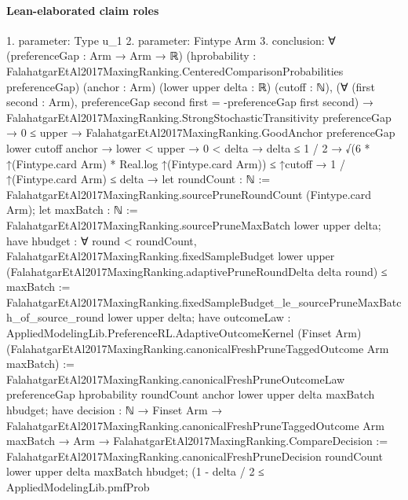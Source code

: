 \documentclass[10pt]{article}
\begin{document}
\paragraph{Lean-elaborated claim roles}\begin{ReviewVerbatim}
1. parameter: Type u_1
2. parameter: Fintype Arm
3. conclusion: ∀ (preferenceGap : Arm → Arm → ℝ)
  (hprobability : FalahatgarEtAl2017MaxingRanking.CenteredComparisonProbabilities preferenceGap) (anchor : Arm)
  (lower upper delta : ℝ) (cutoff : ℕ),
  (∀ (first second : Arm), preferenceGap second first = -preferenceGap first second) →
    FalahatgarEtAl2017MaxingRanking.StrongStochasticTransitivity preferenceGap →
      0 ≤ upper →
        FalahatgarEtAl2017MaxingRanking.GoodAnchor preferenceGap lower cutoff anchor →
          lower < upper →
            0 < delta →
              delta ≤ 1 / 2 →
                √(6 * ↑(Fintype.card Arm) * Real.log ↑(Fintype.card Arm)) ≤ ↑cutoff →
                  1 / ↑(Fintype.card Arm) ≤ delta →
                    let roundCount : ℕ := FalahatgarEtAl2017MaxingRanking.sourcePruneRoundCount (Fintype.card Arm);
                    let maxBatch : ℕ := FalahatgarEtAl2017MaxingRanking.sourcePruneMaxBatch lower upper delta;
                    have hbudget :
                      ∀ round < roundCount,
                        FalahatgarEtAl2017MaxingRanking.fixedSampleBudget lower upper
                            (FalahatgarEtAl2017MaxingRanking.adaptivePruneRoundDelta delta round) ≤
                          maxBatch :=
                      FalahatgarEtAl2017MaxingRanking.fixedSampleBudget_le_sourcePruneMaxBatch_of_source_round lower
                        upper delta;
                    have outcomeLaw :
                      AppliedModelingLib.PreferenceRL.AdaptiveOutcomeKernel (Finset Arm)
                        (FalahatgarEtAl2017MaxingRanking.canonicalFreshPruneTaggedOutcome Arm maxBatch) :=
                      FalahatgarEtAl2017MaxingRanking.canonicalFreshPruneOutcomeLaw preferenceGap hprobability
                        roundCount anchor lower upper delta maxBatch hbudget;
                    have decision :
                      ℕ →
                        Finset Arm →
                          FalahatgarEtAl2017MaxingRanking.canonicalFreshPruneTaggedOutcome Arm maxBatch →
                            Arm → FalahatgarEtAl2017MaxingRanking.CompareDecision :=
                      FalahatgarEtAl2017MaxingRanking.canonicalFreshPruneDecision roundCount lower upper delta maxBatch
                        hbudget;
                    (1 - delta / 2 ≤
                        AppliedModelingLib.pmfProb

\end{ReviewVerbatim}
\end{document}

